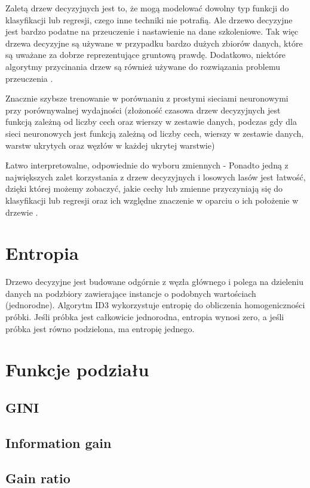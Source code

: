\documentclass[10pt,a4paper]{article}
\begin{document}
Zaletą drzew decyzyjnych jest to, że mogą modelować dowolny typ funkcji do klasyfikacji lub regresji, czego inne techniki nie potrafią. Ale drzewo decyzyjne jest bardzo podatne na przeuczenie i nastawienie na dane szkoleniowe. Tak więc drzewa decyzyjne są używane w przypadku bardzo dużych zbiorów danych, które są uważane za dobrze reprezentujące gruntową prawdę. Dodatkowo, niektóre algorytmy przycinania drzew są również używane do rozwiązania problemu przeuczenia \cite{Breiman1984, MazumdarWWW}.

Znacznie szybsze trenowanie w porównaniu z prostymi sieciami neuronowymi przy porównywalnej wydajności (złożoność czasowa drzew decyzyjnych jest funkcją zależną od liczby cech oraz wierszy w zestawie danych, podczas gdy dla sieci neuronowych jest funkcją zależną od liczby cech, wierszy w zestawie danych, warstw ukrytych oraz węzłów w każdej ukrytej warstwie) \cite{Breiman1984, Lan2017}

Łatwo interpretowalne, odpowiednie do wyboru zmiennych - Ponadto jedną z największych zalet korzystania z drzew decyzyjnych i losowych lasów jest łatwość, dzięki której możemy zobaczyć, jakie cechy lub zmienne przyczyniają się do klasyfikacji lub regresji oraz ich względne znaczenie w oparciu o ich położenie w drzewie \cite{Breiman1984, Lan2017}.

\section{Entropia}
Drzewo decyzyjne jest budowane odgórnie z węzła głównego i polega na dzieleniu danych na podzbiory zawierające instancje o podobnych wartościach (jednorodne). Algorytm ID3 wykorzystuje entropię do obliczenia homogeniczności próbki. Jeśli próbka jest całkowicie jednorodna, entropia wynosi zero, a jeśli próbka jest równo podzielona, ma entropię jednego.


\section{Funkcje podziału}
\subsection{GINI}
\subsection{Information gain}
\subsection{Gain ratio}
\end{document}
